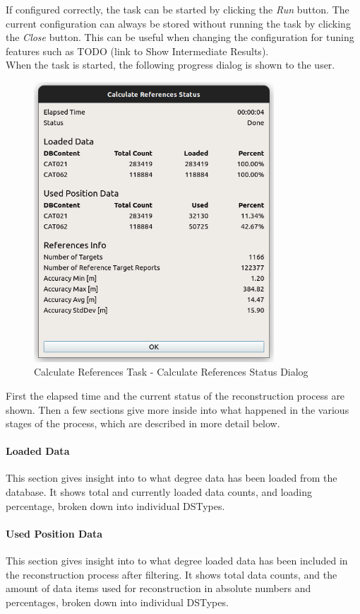 If configured correctly, the task can be started by clicking the \textit{Run} button.
The current configuration can always be stored without running the task by clicking the \textit{Close} button. 
This can be useful when changing the configuration for tuning features such as TODO (link to Show Intermediate Results). \\

When the task is started, the following progress dialog is shown to the user.

\begin{figure}[H]
    \center
      \includegraphics[width=9cm]{figures/ui_task_references_dialog_result.png}
    \caption{Calculate References Task - Calculate References Status Dialog}
\end{figure}

First the elapsed time and the current status of the reconstruction process are shown.
Then a few sections give more inside into what happened in the various stages of the process, 
which are described in more detail below.

\paragraph{Loaded Data} This section gives insight into to what degree data has been loaded from
the database. It shows total and currently loaded data counts, and loading percentage, broken down into
individual DSTypes.

\paragraph{Used Position Data} This section gives insight into to what degree loaded data has been
included in the reconstruction process after filtering. 
It shows total data counts, and the amount of data items used for reconstruction in absolute numbers and percentages,
broken down into individual DSTypes.

